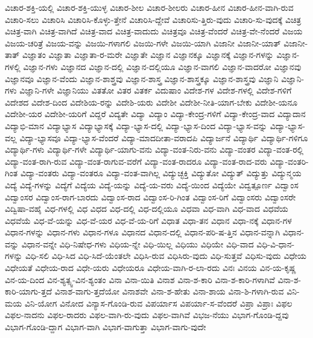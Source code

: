 {ವಿಚಾರ-ಶಕ್ತಿ-ಯಲ್ಲಿ
ವಿಚಾರ-ಶಕ್ತಿ-ಯುಳ್ಳ
ವಿಚಾರ-ಶೀಲ
ವಿಚಾರ-ಶೀಲರು
ವಿಚಾರ-ಹೀನ
ವಿಚಾರ-ಹೀನ-ವಾಗಿ-ರುವ
ವಿಚಾರಿ-ಸಲು
ವಿಚಾರಿಸಿ
ವಿಚಾರಿಸಿ-ಕೊಳ್ಳು-ತ್ತೇನೆ
ವಿಚಾರಿಸಿ-ದ್ದೇವೆ
ವಿಚಾರಿಸು-ತ್ತಿರು-ವುದು
ವಿಚಾರಿ-ಸು-ವುದಕ್ಕೆ
ವಿಚಿತ್ರ
ವಿಚಿತ್ರ-ವಾಗಿ
ವಿಚಿತ್ರ-ವಾಗಿದೆ
ವಿಚಿತ್ರ-ವಾದ
ವಿಚಿತ್ರ-ವಾದುದು
ವಿಚಿತ್ರವೂ
ವಿಚಿತ್ರ-ವೆಂದರೆ
ವಿಚಿತ್ರ-ವೇ-ನೆಂದರೆ
ವಿಜಯ
ವಿಜಯ-ಚರಿತ್ರೆ
ವಿಜಯ-ವನ್ನು
ವಿಜಯಿ-ಗಳಾಗಲಿ
ವಿಜಯಿ-ಗಳೇ
ವಿಜಯಿ-ಯಾಗಿ
ವಿಜಾನೀ
ವಿಜಾನೀ-ಯಾತ್
ವಿಜಾನೀ-ತಾತ್
ವಿಜ್ಞಾತಂ
ವಿಜ್ಞಾತಾ
ವಿಜ್ಞಾತಾ-ರ-ಮರೇ
ವಿಜ್ಞಾತೇ
ವಿಜ್ಞಾನ
ವಿಜ್ಞಾನಕ್ಕೂ
ವಿಜ್ಞಾನಕ್ಕೆ
ವಿಜ್ಞಾನ-ಗಳನ್ನು
ವಿಜ್ಞಾನ-ಗಳಲ್ಲಿ
ವಿಜ್ಞಾನ-ಗಳು
ವಿಜ್ಞಾನದ
ವಿಜ್ಞಾನ-ದಲ್ಲಿ
ವಿಜ್ಞಾನ-ದಲ್ಲಿಯೂ
ವಿಜ್ಞಾನ-ವಾಗಲಿ
ವಿಜ್ಞಾನ-ವಾದರೋ
ವಿಜ್ಞಾನವು
ವಿಜ್ಞಾನವೂ
ವಿಜ್ಞಾನ-ವೆಂದು
ವಿಜ್ಞಾನ-ಶಾಶ್ತ್ರವು
ವಿಜ್ಞಾನ-ಶಾಸ್ತ್ರ
ವಿಜ್ಞಾನ-ಶಾಸ್ತ್ರಕ್ಕೂ
ವಿಜ್ಞಾನ-ಶಾಸ್ತ್ರವು
ವಿಜ್ಞಾನಿ
ವಿಜ್ಞಾನಿ-ಗಳು
ವಿಜ್ಞಾನಿ-ಗಳೇ
ವಿಜ್ಞಾನಿಯು
ವಿತತೋ
ವಿತರ
ವಿತರ್ಕ
ವಿದುಷಾಂ
ವಿದೇಶ-ಗಳ
ವಿದೇಶ-ಗಳಲ್ಲಿ
ವಿದೇಶ-ಗಳಿಗೆ
ವಿದೇಶದ
ವಿದೇಶ-ದಿಂದ
ವಿದೇಶಿಯ-ರನ್ನು
ವಿದೇಶಿ-ಯರು
ವಿದೇಶೀ
ವಿದೇಶೀ-ನೀತಿ-ಯಾಗ-ಬೇಕು
ವಿದೇಶೀ-ಯನೂ
ವಿದೇಶೀ-ಯರ
ವಿದೇಶೀ-ಯರಿಗೆ
ವಿದ್ದರೆ
ವಿದ್ಯತೇ
ವಿದ್ಯಾ
ವಿದ್ಯಾಂ
ವಿದ್ಯಾ-ಕೇಂದ್ರ-ಗಳಿಗೆ
ವಿದ್ಯಾ-ಕೇಂದ್ರ-ವಾದ
ವಿದ್ಯಾದಾನ
ವಿದ್ಯಾಭಿ-ಮಾನ
ವಿದ್ಯಾಭ್ಯಾಸ
ವಿದ್ಯಾಭ್ಯಾಸಕ್ಕೆ
ವಿದ್ಯಾ-ಭ್ಯಾಸ-ದಲ್ಲಿ
ವಿದ್ಯಾ-ಭ್ಯಾಸ-ದಿಂದ
ವಿದ್ಯಾ-ಭ್ಯಾಸ-ವನ್ನು
ವಿದ್ಯಾ-ಭ್ಯಾಸ-ವಲ್ಲ
ವಿದ್ಯಾ-ಭ್ಯಾಸವೂ
ವಿದ್ಯಾ-ಭ್ಯಾಸ-ವೆಂದರೆ
ವಿದ್ಯಾ-ಮಾದದೀತಾ-ವರಾದಪಿ
ವಿದ್ಯಾರ್ಜನೆ
ವಿದ್ಯಾರ್ಥಿ
ವಿದ್ಯಾರ್ಥಿ-ಗಳಿಗೂ
ವಿದ್ಯಾರ್ಥಿ-ಗಳು
ವಿದ್ಯಾರ್ಥಿ-ಗಳೇ
ವಿದ್ಯಾರ್ಥಿ-ಯಾಗು-ವನು
ವಿದ್ಯಾ-ವಂತ-ನಿರು-ವನು
ವಿದ್ಯಾ-ವಂತರ
ವಿದ್ಯಾ-ವಂತ-ರಲ್ಲಿ
ವಿದ್ಯಾ-ವಂತ-ರಾಗಿ-ರುವ
ವಿದ್ಯಾ-ವಂತ-ರಾಗುವ-ವರೆಗೆ
ವಿದ್ಯಾ-ವಂತ-ರಾದರೂ
ವಿದ್ಯಾ-ವಂತ-ರಾದ-ವರು
ವಿದ್ಯಾ-ವಂತರಿ-ಗಿಂತ
ವಿದ್ಯಾ-ವಂತರು
ವಿದ್ಯಾ-ವಂತರೂ
ವಿದ್ಯಾ-ವಂತ-ವಾಗಿಲ್ಲ
ವಿದ್ಯುಚ್ಛಕ್ತಿ
ವಿದ್ಯುತೋ
ವಿದ್ಯುತ್
ವಿದ್ಯುತ್ತು
ವಿದ್ಯುನ್ಮಯ
ವಿದ್ಯೆ
ವಿದ್ಯೆ-ಗಳನ್ನು
ವಿದ್ಯೆಗೆ
ವಿದ್ಯೆಯ
ವಿದ್ಯೆ-ಯನ್ನು
ವಿದ್ಯೆ-ಯ-ವರು
ವಿದ್ಯೆ-ಯಿಂದ
ವಿದ್ಯೆಯೇ
ವಿದ್ವತ್ಪೂರ್ಣ
ವಿದ್ವಾಂಸ
ವಿದ್ವಾಂಸರ
ವಿದ್ವಾಂಸ-ರಾಗ-ಬಾರದು
ವಿದ್ವಾಂಸ-ರಾದ
ವಿದ್ವಾಂಸ-ರಿ-ಗಿಂತ
ವಿದ್ವಾಂಸ-ರಿಗೆ
ವಿದ್ವಾಂಸರು
ವಿದ್ವಾಂಸರೇ
ವಿದ್ವಿಷಾ-ವಹೈ
ವಿಧ-ಗಳಲ್ಲಿ
ವಿಧ
ವಿಧದ
ವಿಧ-ದಲ್ಲಿ
ವಿಧ-ದಲ್ಲಿಯೂ
ವಿಧವಾ
ವಿಧ-ವಾಗಿ
ವಿಧ-ವಾದ
ವಿಧವೆಯ
ವಿಧವೆಯೆ
ವಿಧ-ವೆ-ಯನ್ನು
ವಿಧ-ವೆ-ಯರ
ವಿಧ-ವೆ-ಯ-ರಿಗೆ
ವಿಧಾತ
ವಿಧಾ-ತನ
ವಿಧಾನ
ವಿಧಾ-ನಕ್ಕೆ
ವಿಧಾನ-ಗಳ
ವಿಧಾನ-ಗಳನ್ನು
ವಿಧಾನ-ಗಳು
ವಿಧಾನ-ಗಳೂ
ವಿಧಾನದ
ವಿಧಾನ-ದಲ್ಲಿ
ವಿಧಾನ-ಪರಿ-ಷ-ತ್ತಿನ
ವಿಧಾನ-ವನ್ನಾಗಿ
ವಿಧಾನ-ವನ್ನು
ವಿಧಾನ-ವನ್ನೇ
ವಿಧಿ-ನಿಷೇಧ-ಗಳು
ವಿಧಿಯ-ನ್ನೇ
ವಿಧಿ-ಯಿಲ್ಲ
ವಿಧಿಯು
ವಿಧಿಯೇ
ವಿಧಿ-ವಾದ
ವಿಧಿ-ವಿ-ಧಾನ-ಗಳನ್ನು
ವಿಧಿ-ಸಲಿ
ವಿಧಿ-ಸಿದ
ವಿಧಿ-ಸಿದೆ-ಯೆಂತಲೇ
ವಿಧಿಸಿ-ರುವ
ವಿಧಿಸಿರು-ವುದು
ವಿಧಿ-ಸುತ್ತವೆ
ವಿಧಿಸು-ವುದು
ವಿಧೇಯ
ವಿಧೇಯತೆ
ವಿಧೇಯ-ರಾದ
ವಿಧೇ-ಯರು
ವಿಧೇಯರೂ
ವಿಧೇಯ-ವಾಗಿ-ರ-ಲಾ-ರದು
ವಿನಃ
ವಿನಯ
ವಿನ-ಯ-ಕೃಷ್ಣ
ವಿನ-ಯ-ದಿಂದ
ವಿನ-ಶ್ಯತ್ಸ್ವ-ವಿನ-ಶ್ಯಂತಂ
ವಿನಾ
ವಿನಾ-ಯಿತಿ
ವಿನಾಶ
ವಿನಾ-ಶ-ಕಾರಿ
ವಿನಾ-ಶ-ಕಾರಿ-ಗಳಾಗಿವೆ
ವಿನಾ-ಶ-ಕಾರಿ-ಯಾಗು-ತ್ತದೆ
ವಿನಾಶ-ವಾಗು-ತ್ತದೆಯೋ
ವಿನಾಶವೇ
ವಿನಾ-ಶ-ಹೇತು
ವಿನಾ-ಶಾಯ
ವಿನಾ-ಶಿ-ಗಳಾಗಿ-ರುವ
ವಿನಿ-ಮಯ
ವಿನಿ-ಯೋಗ
ವಿನೋದ
ವಿನ್ಯಾಸ-ಗೊಂಡಿ-ರುವ
ವಿಪರ್ಯಾಸ
ವಿಪರ್ಯಾ-ಸ-ವೆಂದರೆ
ವಿಪ್ರಾ
ವಿಪ್ರಾಃ
ವಿಫಲ
ವಿಫಲ-ನಾದನು
ವಿಫಲ-ರಾದರು
ವಿಫಲ-ವಾಗಿ-ರು-ವುದು
ವಿಫಲ-ವಾಗಿವೆ
ವಿಭಜ-ನೆಯು
ವಿಭಾಗ-ಗೊಂಡಿ-ದ್ದವು
ವಿಭಾಗ-ಗೊಂಡಿ-ದ್ದಾಗ
ವಿಭಾಗ-ವಾಗಿ
ವಿಭಾಗ-ವಾಗುತ್ತಾ
ವಿಭಾಗ-ವಾಗು-ವುದೇ
}
